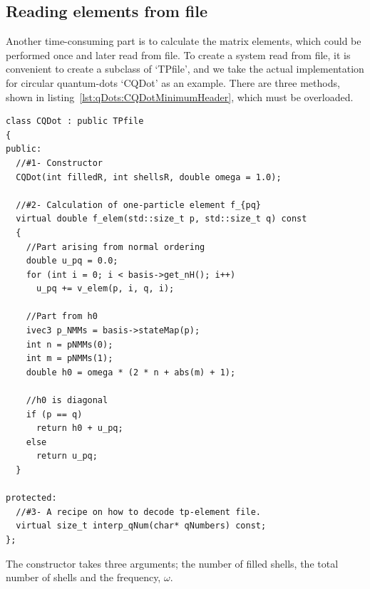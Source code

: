 \subsection{Reading elements from file}
\label{sec:qDots:TPfile}
Another time-consuming part is to calculate the matrix elements, which could be performed once and later read from file. 
To create a system read from file, it is convenient to create a subclass of `TPfile', and we take the actual implementation for circular quantum-dots `CQDot' as an example.
There are three methods, shown in listing~\ref{lst:qDots:CQDotMinimumHeader}, which must be overloaded.
\begin{lstlisting}[float,label={lst:qDots:CQDotMinimumHeader},caption={The three most important parts a subclass of `TPfile' would need. The actual implementation of `CQDot' includes some extra methods and private variables.}]
class CQDot : public TPfile
{
public:
  //#1- Constructor
  CQDot(int filledR, int shellsR, double omega = 1.0);
  
  //#2- Calculation of one-particle element f_{pq}
  virtual double f_elem(std::size_t p, std::size_t q) const
  {
    //Part arising from normal ordering
    double u_pq = 0.0;
    for (int i = 0; i < basis->get_nH(); i++)
      u_pq += v_elem(p, i, q, i);
    
	//Part from h0
    ivec3 p_NMMs = basis->stateMap(p);
    int n = pNMMs(0);
    int m = pNMMs(1);
    double h0 = omega * (2 * n + abs(m) + 1);

	//h0 is diagonal
	if (p == q)
      return h0 + u_pq;     
    else
      return u_pq;
  }

protected:
  //#3- A recipe on how to decode tp-element file.
  virtual size_t interp_qNum(char* qNumbers) const;
};
\end{lstlisting}
The constructor takes three arguments; the number of filled shells, the total number of shells and the frequency, $\omega$.

